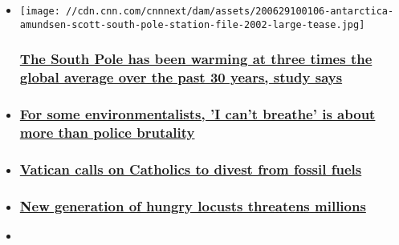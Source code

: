 \begin{itemize}
\item
  \href{/2020/06/29/weather/south-pole-record-warming-antarctica-intl-hnk/index.html}{}

  \texttt{[image: //cdn.cnn.com/cnnnext/dam/assets/200629100106-antarctica-amundsen-scott-south-pole-station-file-2002-large-tease.jpg]}

  \hypertarget{the-south-pole-has-been-warming-at-three-times-the-global-average-over-the-past-30-years-study-says}{%
  \subsubsection{\texorpdfstring{\href{/2020/06/29/weather/south-pole-record-warming-antarctica-intl-hnk/index.html}{\textbf{The
  South Pole has been warming at three times the global average over the
  past 30 years, study
  says}}}{The South Pole has been warming at three times the global average over the past 30 years, study says}}\label{the-south-pole-has-been-warming-at-three-times-the-global-average-over-the-past-30-years-study-says}}
\item
  \hypertarget{for-some-environmentalists-i-cant-breathe-is-about-more-than-police-brutality}{%
  \subsubsection{\texorpdfstring{\href{/2020/06/27/us/environmental-racism-explainer-trnd/index.html}{For
  some environmentalists, 'I can't breathe' is about more than police
  brutality}}{For some environmentalists, 'I can't breathe' is about more than police brutality}}\label{for-some-environmentalists-i-cant-breathe-is-about-more-than-police-brutality}}
\item
  \hypertarget{vatican-calls-on-catholics-to-divest-from-fossil-fuels}{%
  \subsubsection{\texorpdfstring{\href{/2020/06/19/business/vatican-fossil-fuel-ban/index.html}{Vatican
  calls on Catholics to divest from fossil
  fuels}}{Vatican calls on Catholics to divest from fossil fuels}}\label{vatican-calls-on-catholics-to-divest-from-fossil-fuels}}
\item
  \hypertarget{new-generation-of-hungry-locusts-threatens-millions}{%
  \subsubsection{\texorpdfstring{\href{https://edition.cnn.com/interactive/2020/05/africa/locusts/}{New
  generation of hungry locusts threatens
  millions}}{New generation of hungry locusts threatens millions}}\label{new-generation-of-hungry-locusts-threatens-millions}}
\item
  \hypertarget{follow-cnnclimate-on-instagram}{%
}
\end{itemize}

